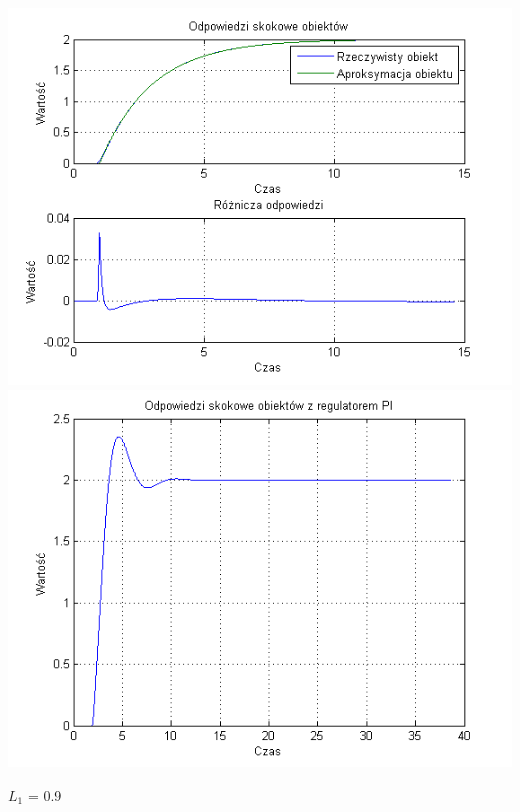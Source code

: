 \documentclass[10pt,a4paper]{article}
\begin{document}
\begin{center}
\includegraphics[scale=1]{images/jeden/skrypt_185.png}\\
\includegraphics[scale=1]{images/jeden/skrypt_186.png}\\
\end{center}
\newpage
$L_1$ = 0.9
\end{document}
